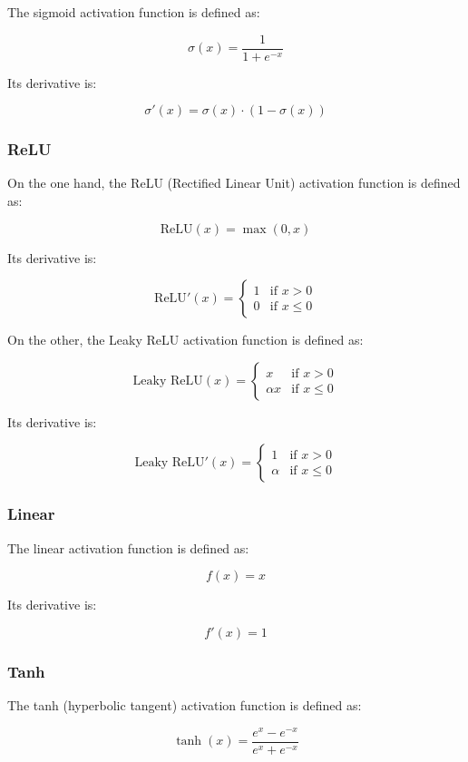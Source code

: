 \documentclass[11pt, a4paper]{article}
\begin{document}
The sigmoid activation function is defined as:

$$ \sigma(x) = \frac{1}{1 + e^{-x}} $$

Its derivative is:

$$ \sigma'(x) = \sigma(x) \cdot (1 - \sigma(x)) $$

\subsubsection{ReLU}

On the one hand, the ReLU (Rectified Linear Unit) activation function is defined as:

$$ \text{ReLU}(x) = \max(0, x) $$

Its derivative is:

$$
\text{ReLU}'(x) = \begin{cases} 
1 & \text{if } x > 0 \\ 
0 & \text{if } x \leq 0 
\end{cases}
$$

On the other, the Leaky ReLU activation function is defined as:

$$
\text{Leaky ReLU}(x) = \begin{cases} 
x & \text{if } x > 0 \\ 
\alpha x & \text{if } x \leq 0 
\end{cases}
$$

Its derivative is:

$$
\text{Leaky ReLU}'(x) = \begin{cases} 
1 & \text{if } x > 0 \\ 
\alpha & \text{if } x \leq 0 
\end{cases}
$$

\subsubsection{Linear}

The linear activation function is defined as:

$$ f(x) = x $$

Its derivative is:

$$ f'(x) = 1 $$

\subsubsection{Tanh}

The tanh (hyperbolic tangent) activation function is defined as:

$$ \tanh(x) = \frac{e^x - e^{-x}}{e^x + e^{-x}} $$
\end{document}
